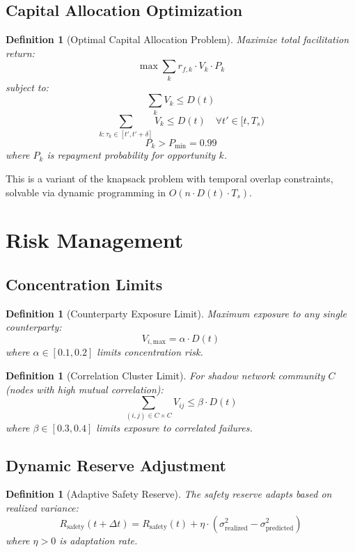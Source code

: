 \documentclass[12pt]{article}
\newtheorem{definition}[theorem]{Definition}
\begin{document}
\subsection{Capital Allocation Optimization}

\begin{definition}[Optimal Capital Allocation Problem]
Maximize total facilitation return:
$$
\max \sum_{k} r_{f,k} \cdot V_k \cdot P_k
$$
subject to:
$$
\sum_{k} V_k \leq D(t)
$$
$$
\sum_{k: \tau_k \in [t',t'+\delta]} V_k \leq D(t) \quad \forall t' \in [t, T_s)
$$
$$
P_k > P_{\min} = 0.99
$$
where $P_k$ is repayment probability for opportunity $k$.
\end{definition}

This is a variant of the knapsack problem with temporal overlap constraints, solvable via dynamic programming in $O(n \cdot D(t) \cdot T_s)$.

\section{Risk Management}

\subsection{Concentration Limits}

\begin{definition}[Counterparty Exposure Limit]
Maximum exposure to any single counterparty:
$$
V_{i,\text{max}} = \alpha \cdot D(t)
$$
where $\alpha \in [0.1, 0.2]$ limits concentration risk.
\end{definition}

\begin{definition}[Correlation Cluster Limit]
For shadow network community $C$ (nodes with high mutual correlation):
$$
\sum_{(i,j) \in C \times C} V_{ij} \leq \beta \cdot D(t)
$$
where $\beta \in [0.3, 0.4]$ limits exposure to correlated failures.
\end{definition}

\subsection{Dynamic Reserve Adjustment}

\begin{definition}[Adaptive Safety Reserve]
The safety reserve adapts based on realized variance:
$$
R_{\text{safety}}(t+\Delta t) = R_{\text{safety}}(t) + \eta \cdot (\sigma_{\text{realized}}^2 - \sigma_{\text{predicted}}^2)
$$
where $\eta > 0$ is adaptation rate.
\end{definition}
\end{document}
